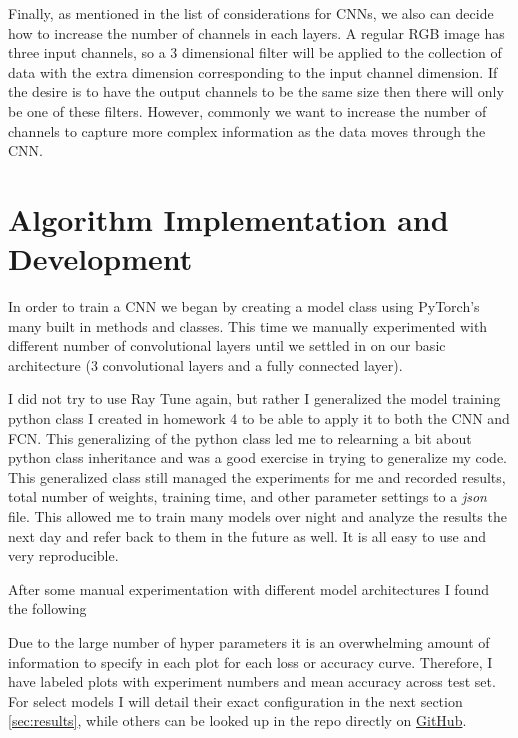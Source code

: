 \documentclass[11pt]{amsart}
\begin{document}
Finally, as mentioned in the list of considerations for CNNs, we also can decide how to increase the number of channels in each layers.
A regular RGB image has three input channels, so a 3 dimensional filter will be applied to the collection of data with the extra dimension corresponding to the input channel dimension.
If the desire is to have the output channels to be the same size then there will only be one of these filters.
However, commonly we want to increase the number of channels to capture more complex information as the data moves through the CNN.

\section{Algorithm Implementation and Development}\label{sec:algorithms}
In order to train a CNN we began by creating a model class using PyTorch's \cite{Ansel_PyTorch_2_Faster_2024} many built in methods and classes.
This time we manually experimented with different number of convolutional layers until we settled in on our basic architecture (3 convolutional layers and a fully connected layer).

I did not try to use Ray Tune \cite{liaw2018tune} again, but rather I generalized the model training python class I created in homework 4 to be able to apply it to both the CNN and FCN.
This generalizing of the python class led me to relearning a bit about python class inheritance and was a good exercise in trying to generalize my code.
This generalized class still managed the experiments for me and recorded results, total number of weights, training time, and other parameter settings to a \textit{json} file.
This allowed me to train many models over night and analyze the results the next day and refer back to them in the future as well.
It is all easy to use and very reproducible.

After some manual experimentation with different model architectures I found the following

Due to the large number of hyper parameters it is an overwhelming amount of information to specify in each plot for each loss or accuracy curve.
Therefore, I have labeled plots with experiment numbers and mean accuracy across test set.
For select models I will detail their exact configuration in the next section \ref{sec:results}, while others can be looked up in the repo directly on \href{https://github.com/hunter-lybbert/uw-central/blob/main/data_analysis/hw_05/experiments/experiments.json}{GitHub}.
\end{document}

